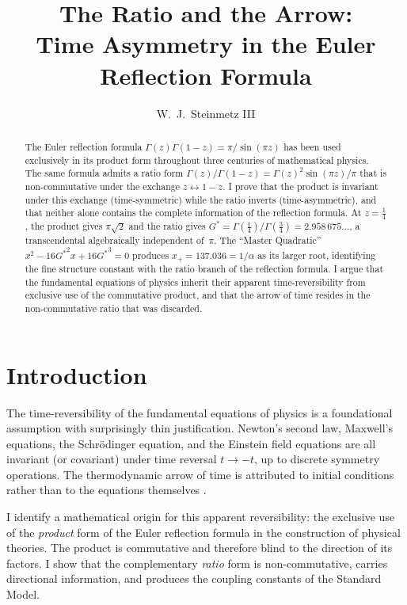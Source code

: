 \documentclass[12pt,reqno]{amsart}
\title[The Ratio and the Arrow]{The Ratio and the Arrow:\\[2pt]
  Time Asymmetry in the Euler Reflection Formula}
\author{W.\ J.\ Steinmetz III}
\date{}
\theoremstyle{definition}
\theoremstyle{remark}
\newcommand{\Gstar}{G^{\!*}}
\begin{document}
\begin{abstract}
The Euler reflection formula $\Gamma(z)\Gamma(1-z) = \pi/\sin(\pi z)$ has been used exclusively in its product form throughout three centuries of mathematical physics. The same formula admits a ratio form $\Gamma(z)/\Gamma(1-z) = \Gamma(z)^2\sin(\pi z)/\pi$ that is non-commutative under the exchange $z \leftrightarrow 1-z$. I prove that the product is invariant under this exchange (time-symmetric) while the ratio inverts (time-asymmetric), and that neither alone contains the complete information of the reflection formula. At $z=\frac{1}{4}$, the product gives $\pi\sqrt{2}$ and the ratio gives $\Gstar = \Gamma(\frac{1}{4})/\Gamma(\frac{3}{4}) = 2.958\,675\ldots$, a transcendental algebraically independent of~$\pi$. The ``Master Quadratic'' $x^2 - 16{G^*}^2 x + 16{G^*}^3 = 0$ produces $x_+ = 137.036 = 1/\alpha$ as its larger root, identifying the fine structure constant with the ratio branch of the reflection formula. I argue that the fundamental equations of physics inherit their apparent time-reversibility from exclusive use of the commutative product, and that the arrow of time resides in the non-commutative ratio that was discarded.
\end{abstract}

\maketitle

\section{Introduction}

The time-reversibility of the fundamental equations of physics is a foundational assumption with surprisingly thin justification. Newton's second law, Maxwell's equations, the Schr\"odinger equation, and the Einstein field equations are all invariant (or covariant) under time reversal $t \to -t$, up to discrete symmetry operations. The thermodynamic arrow of time is attributed to initial conditions rather than to the equations themselves \cite{Penrose1989}.

I identify a mathematical origin for this apparent reversibility: the exclusive use of the \emph{product} form of the Euler reflection formula in the construction of physical theories. The product is commutative and therefore blind to the direction of its factors. I show that the complementary \emph{ratio} form is non-commutative, carries directional information, and produces the coupling constants of the Standard Model.
\end{document}
